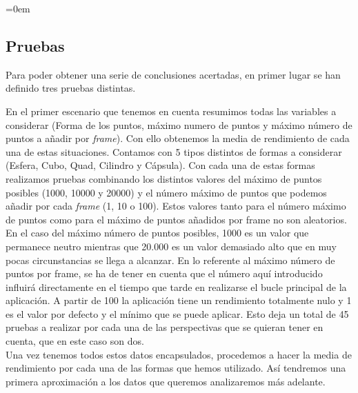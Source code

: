 \parindent=0em
\subsection{Pruebas}
\noindent

Para poder obtener una serie de conclusiones acertadas, en primer lugar se han definido tres pruebas distintas. 

En el primer escenario que tenemos en cuenta resumimos todas las variables a considerar (Forma de los puntos, máximo numero de puntos y máximo número de puntos a añadir por \textit{frame}). Con ello obtenemos la media de rendimiento de cada una de estas situaciones. Contamos con 5 tipos distintos de formas a considerar (Esfera, Cubo, Quad, Cilindro y Cápsula). Con cada una de estas formas realizamos pruebas combinando los distintos valores del máximo de puntos posibles (1000, 10000 y 20000) y el número máximo de puntos que podemos añadir por cada \textit{frame} (1, 10 o 100). Estos valores tanto para el número máximo de puntos como para el máximo de puntos añadidos por frame no son aleatorios. En el caso del máximo número de puntos posibles, 1000 es un valor que permanece neutro mientras que 20.000 es un valor demasiado alto que en muy pocas circunstancias se llega a alcanzar. En lo referente al máximo número de puntos por frame, se ha de tener en cuenta que el número aquí introducido influirá directamente en el tiempo que tarde en realizarse el bucle principal de la aplicación. A partir de 100 la aplicación tiene un rendimiento totalmente nulo y 1 es el valor por defecto y el mínimo que se puede aplicar. Esto deja un total de 45 pruebas a realizar por cada una de las perspectivas que se quieran tener en cuenta, que en este caso son dos.\\

Una vez tenemos todos estos datos encapsulados, procedemos a hacer la media de rendimiento por cada una de las formas que hemos utilizado. Así tendremos una primera aproximación a los datos que queremos analizaremos más adelante.\\

\begin{table}[ht]
\centering
{}
\caption{Media de Frames Por Segundo (FPS) para cada una de las formas disponibles a la hora de realizar la oclusión. }
\label{cuadro:comparacionpesopreciosHMD}
\end{table}

